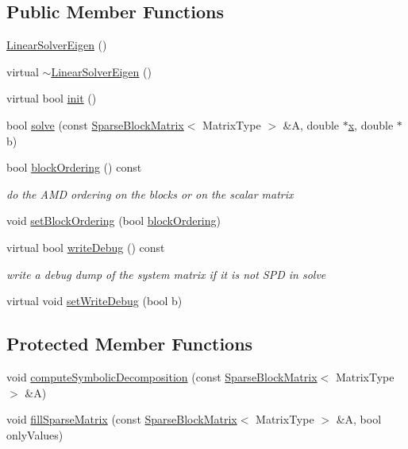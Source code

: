 \subsection*{Public Member Functions}
\begin{DoxyCompactItemize}
\item 
\hyperlink{classg2o_1_1LinearSolverEigen_ac9e7b64d4a559e6972a8b3798f490bd8}{Linear\+Solver\+Eigen} ()
\item 
virtual \hyperlink{classg2o_1_1LinearSolverEigen_afd2eeb1d54a420e110b9b8cdf74b1cff}{$\sim$\+Linear\+Solver\+Eigen} ()
\item 
virtual bool \hyperlink{classg2o_1_1LinearSolverEigen_a8fca4bb987dcbeb94a366b1532dee139}{init} ()
\item 
bool \hyperlink{classg2o_1_1LinearSolverEigen_ae4ac566af324a238a31145c1e50b52e1}{solve} (const \hyperlink{classg2o_1_1SparseBlockMatrix}{Sparse\+Block\+Matrix}$<$ Matrix\+Type $>$ \&A, double $\ast$\hyperlink{sparse__helper_8cpp_af88b946fb90d5f08b5fb740c70e98c10}{x}, double $\ast$b)
\item 
bool \hyperlink{classg2o_1_1LinearSolverEigen_a962d9062e095399706ae4614f058a27c}{block\+Ordering} () const 
\begin{DoxyCompactList}\small\item\em do the A\+MD ordering on the blocks or on the scalar matrix \end{DoxyCompactList}\item 
void \hyperlink{classg2o_1_1LinearSolverEigen_a33a924364fc517e69c5ade5aeacd8ee3}{set\+Block\+Ordering} (bool \hyperlink{classg2o_1_1LinearSolverEigen_a962d9062e095399706ae4614f058a27c}{block\+Ordering})
\item 
virtual bool \hyperlink{classg2o_1_1LinearSolverEigen_a6b70f3c7b1c8c8105c05c7c560c670c2}{write\+Debug} () const 
\begin{DoxyCompactList}\small\item\em write a debug dump of the system matrix if it is not S\+PD in solve \end{DoxyCompactList}\item 
virtual void \hyperlink{classg2o_1_1LinearSolverEigen_a5ceaab3ba944d327b21f7329c7e19c8c}{set\+Write\+Debug} (bool b)
\end{DoxyCompactItemize}
\subsection*{Protected Member Functions}
\begin{DoxyCompactItemize}
\item 
void \hyperlink{classg2o_1_1LinearSolverEigen_a12307526d419d194620e982d8c683767}{compute\+Symbolic\+Decomposition} (const \hyperlink{classg2o_1_1SparseBlockMatrix}{Sparse\+Block\+Matrix}$<$ Matrix\+Type $>$ \&A)
\item 
void \hyperlink{classg2o_1_1LinearSolverEigen_a8ab862dc1eebb6ec5815f3970e9073f3}{fill\+Sparse\+Matrix} (const \hyperlink{classg2o_1_1SparseBlockMatrix}{Sparse\+Block\+Matrix}$<$ Matrix\+Type $>$ \&A, bool only\+Values)
\end{DoxyCompactItemize}
